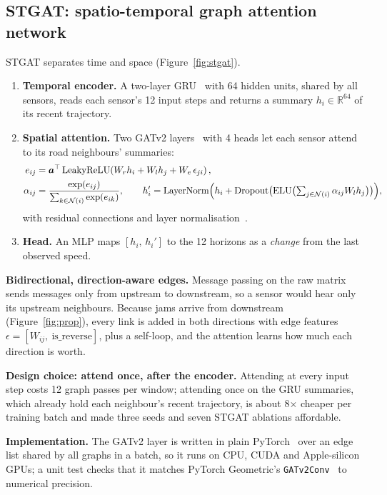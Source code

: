 \documentclass[11pt,a4paper]{article}
\begin{document}
\subsection{STGAT: spatio-temporal graph attention network}\label{sec:stgat}
STGAT separates time and space (Figure~\ref{fig:stgat}).
\begin{enumerate}
\item \textbf{Temporal encoder.} A two-layer GRU~\citep{cho2014gru} with 64 hidden units, shared by all sensors, reads
each sensor's 12 input steps and returns a summary $h_i\in\mathbb R^{64}$ of its recent trajectory.
\item \textbf{Spatial attention.} Two GATv2 layers~\citep{brody2022gatv2} with 4 heads let each sensor attend to its road
neighbours' summaries:
\begin{align}
e_{ij} &= \bm a^{\top}\,\mathrm{LeakyReLU}\!\left(W_r h_i + W_l h_j + W_e\,\epsilon_{ji}\right),\\
\alpha_{ij} &= \frac{\exp(e_{ij})}{\sum_{k\in\mathcal N(i)}\exp(e_{ik})},\qquad
h_i' = \mathrm{LayerNorm}\Bigl(h_i + \mathrm{Dropout}\bigl(\mathrm{ELU}\bigl(\textstyle\sum_{j\in\mathcal N(i)}\alpha_{ij}W_l h_j\bigr)\bigr)\Bigr),
\end{align}
with residual connections and layer normalisation~\citep{ba2016layernorm}.
\item \textbf{Head.} An MLP maps $[h_i,\,h_i']$ to the 12 horizons as a \emph{change} from the last observed speed.
\end{enumerate}

\textbf{Bidirectional, direction-aware edges.} Message passing on the raw matrix sends messages only from upstream to
downstream, so a sensor would hear only its upstream neighbours. Because jams arrive from downstream
(Figure~\ref{fig:prop}), every link is added in both directions with edge features $\epsilon=[W_{ij},\ \text{is\_reverse}]$,
plus a self-loop, and the attention learns how much each direction is worth.

\textbf{Design choice: attend once, after the encoder.} Attending at every input step costs 12 graph passes per window;
attending once on the GRU summaries, which already hold each neighbour's recent trajectory, is about 8$\times$ cheaper
per training batch and made three seeds and seven STGAT ablations affordable.

\textbf{Implementation.} The GATv2 layer is written in plain PyTorch~\citep{paszke2019pytorch} over an edge list shared by
all graphs in a batch, so it runs on CPU, CUDA and Apple-silicon GPUs; a unit test checks that it matches PyTorch
Geometric's \texttt{GATv2Conv}~\citep{fey2019pyg} to numerical precision.
\end{document}
